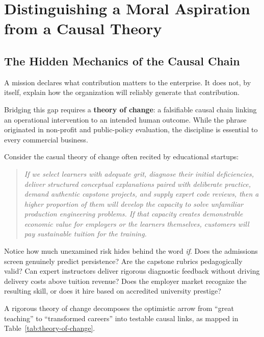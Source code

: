 \section{Distinguishing a Moral Aspiration from a Causal Theory}

\subsection{The Hidden Mechanics of the Causal Chain}

A mission declares what contribution matters to the enterprise. It does not, by itself, explain how the organization will reliably generate that contribution.

Bridging this gap requires a \textbf{theory of change}: a falsifiable causal chain linking an operational intervention to an intended human outcome. While the phrase originated in non-profit and public-policy evaluation, the discipline is essential to every commercial business.

Consider the casual theory of change often recited by educational startups:

\begin{quote}
\itshape
If we select learners with adequate grit, diagnose their initial deficiencies, deliver structured conceptual explanations paired with deliberate practice, demand authentic capstone projects, and supply expert code reviews, then a higher proportion of them will develop the capacity to solve unfamiliar production engineering problems. If that capacity creates demonstrable economic value for employers or the learners themselves, customers will pay sustainable tuition for the training.
\end{quote}

Notice how much unexamined risk hides behind the word \textit{if}. Does the admissions screen genuinely predict persistence? Are the capstone rubrics pedagogically valid? Can expert instructors deliver rigorous diagnostic feedback without driving delivery costs above tuition revenue? Does the employer market recognize the resulting skill, or does it hire based on accredited university prestige?

A rigorous theory of change decomposes the optimistic arrow from ``great teaching'' to ``transformed careers'' into testable causal links, as mapped in Table~\ref{tab:theory-of-change}.

